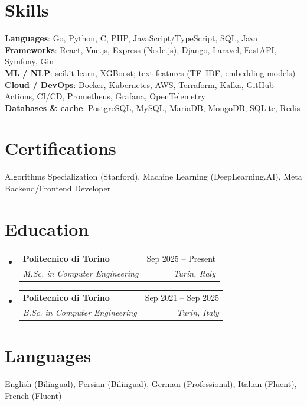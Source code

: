 \documentclass[11pt,a4paper]{article}
\makeatletter
\newcommand{\resumeSubheading}[4]{
  \vspace{-2pt}\item
    \begin{tabular*}{0.97\textwidth}[t]{l@{\extracolsep{\fill}}r}
      \textbf{#1} & #2 \\
      \textit{\small#3} & \textit{\small #4} \\
    \end{tabular*}\vspace{-7pt}
}
\newcommand{\resumeSubHeadingListStart}{\begin{itemize}[leftmargin=0.15in, label={}]}
\newcommand{\resumeSubHeadingListEnd}{\end{itemize}}
\makeatother
\begin{document}
\section{Skills}
 \begin{itemize}[leftmargin=0.15in, label={}]
    \small{\item{
     \textbf{Languages}{: Go, Python, C, PHP, JavaScript/TypeScript, SQL, Java} \\
     \textbf{Frameworks}{: React, Vue.js, Express (Node.js), Django, Laravel, FastAPI, Symfony, Gin} \\
     \textbf{ML / NLP}{: scikit-learn, XGBoost; text features (TF--IDF, embedding models)} \\
     \textbf{Cloud / DevOps}{: Docker, Kubernetes, AWS, Terraform, Kafka, GitHub Actions, CI/CD, Prometheus, Grafana, OpenTelemetry} \\
     \textbf{Databases \& cache}{: PostgreSQL, MySQL, MariaDB, MongoDB, SQLite, Redis}
    }}
 \end{itemize}

\section{Certifications}
\begin{itemize}[leftmargin=0.15in, label={}]
    \small{\item{Algorithms Specialization (Stanford), Machine Learning (DeepLearning.AI), Meta Backend/Frontend Developer}}
\end{itemize}

\section{Education}
\resumeSubHeadingListStart
  \resumeSubheading
    {Politecnico di Torino}{Sep 2025 -- Present}
    {M.Sc. in Computer Engineering}{Turin, Italy}
  \resumeSubheading
    {Politecnico di Torino}{Sep 2021 -- Sep 2025}
    {B.Sc. in Computer Engineering}{Turin, Italy}
\resumeSubHeadingListEnd

\section{Languages}
    \small{English (Bilingual), Persian (Bilingual), German (Professional), Italian (Fluent), French (Fluent)}
\end{document}
